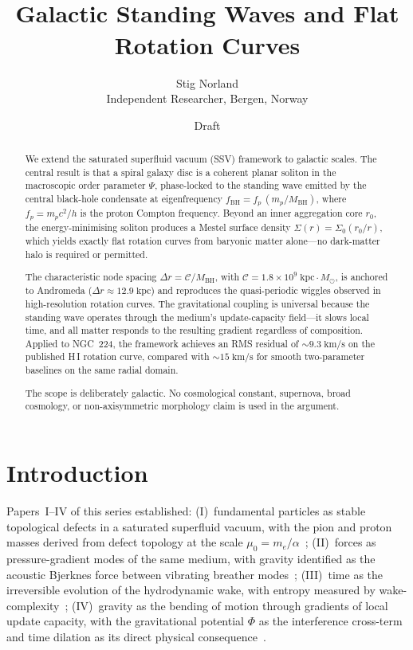 \documentclass[11pt,a4paper]{article}
\title{\textbf{\seriesname~\papernumber}\\[0.4em]
\large Galactic Standing Waves and Flat Rotation Curves}
\author{Stig Norland\\
Independent Researcher, Bergen, Norway}
\date{Draft}
\begin{document}
\maketitle

\begin{abstract}
We extend the saturated superfluid vacuum (SSV) framework to galactic scales.  The central
result is that a spiral galaxy disc is a coherent planar soliton in the macroscopic order
parameter $\Psi$, phase-locked to the standing wave emitted by the central black-hole
condensate at eigenfrequency $f_\mathrm{BH} = f_p\,(m_p/M_\mathrm{BH})$, where $f_p =
m_p c^2/h$ is the proton Compton frequency.  Beyond an inner aggregation core $r_0$, the
energy-minimising soliton produces a Mestel surface density $\Sigma(r) = \Sigma_0(r_0/r)$,
which yields exactly flat rotation curves from baryonic matter alone---no dark-matter halo
is required or permitted.

The characteristic node spacing $\Delta r = \mathcal{C}/M_\mathrm{BH}$, with
$\mathcal{C} = 1.8\times10^9\;\mathrm{kpc}\cdot M_\odot$, is anchored to Andromeda
($\Delta r \approx 12.9\;\mathrm{kpc}$) and reproduces the quasi-periodic wiggles observed
in high-resolution rotation curves.  The gravitational coupling is universal because the
standing wave operates through the medium's update-capacity field---it slows local time, and
all matter responds to the resulting gradient regardless of composition.  Applied to
NGC~224, the framework achieves an RMS residual of $\sim9.3\;\mathrm{km/s}$ on the
published H\,I rotation curve, compared with $\sim15\;\mathrm{km/s}$ for smooth
two-parameter baselines on the same radial domain.

The scope is deliberately galactic.  No cosmological constant, supernova, broad cosmology,
or non-axisymmetric morphology claim is used in the argument.
\end{abstract}

\newpage
\tableofcontents
\newpage

\section{Introduction}
\label{sec:intro}

Papers~I--IV of this series established:
(I)~fundamental particles as stable topological defects in a saturated superfluid vacuum,
with the pion and proton masses derived from defect topology at the scale
$\mu_0=m_e/\alpha$~\cite{SSV-I};
(II)~forces as pressure-gradient modes of the same medium, with gravity identified as the
acoustic Bjerknes force between vibrating breather modes~\cite{SSV-II};
(III)~time as the irreversible evolution of the hydrodynamic wake, with entropy measured
by wake-complexity~\cite{SSV-III};
(IV)~gravity as the bending of motion through gradients of local update capacity, with the
gravitational potential $\Phi$ as the interference cross-term and time dilation as its
direct physical consequence~\cite{SSV-IV}.
\end{document}
